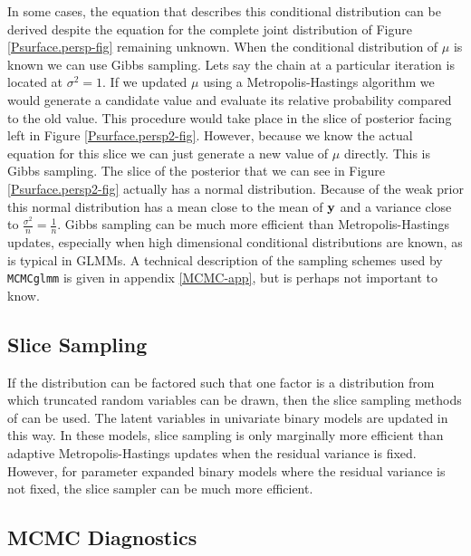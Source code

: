 \documentclass{article}
\begin{document}
 In some cases, the equation that describes this conditional distribution can be derived despite the equation for the complete joint distribution of Figure \ref{Psurface.persp-fig} remaining unknown.  When the conditional distribution of $\mu$ is known we can use Gibbs sampling. Lets say the chain at a particular iteration is located at $\sigma^{2}=1$.  If we updated $\mu$ using a Metropolis-Hastings algorithm we would generate a candidate value and evaluate its relative probability compared to the old value.  This procedure would take place in the slice of posterior facing left in Figure \ref{Psurface.persp2-fig}. However, because we know the actual equation for this slice we can just generate a new value of $\mu$ directly. This is Gibbs sampling.  The slice of the posterior that we can see in Figure \ref{Psurface.persp2-fig} actually has a normal distribution. Because of the weak prior this normal distribution has a mean close to the mean of $\bf{y}$ and a variance close to $\frac{\sigma^{2}}{n} = \frac{1}{n}$.  Gibbs sampling can be much more efficient than Metropolis-Hastings updates, especially when high dimensional conditional distributions are known, as is typical in GLMMs. A technical description of the sampling schemes used by \texttt{MCMCglmm} is given in appendix \ref{MCMC-app}, but is perhaps not important to know.

\subsection{Slice Sampling}

If the distribution can be factored such that one factor is a distribution from which truncated random variables can be drawn, then the slice sampling methods of \citet{Damien.1997} can be used. The latent variables in univariate binary models are updated in this way. In these models, slice sampling is only marginally more efficient than adaptive Metropolis-Hastings updates when the residual variance is fixed. However, for parameter expanded binary models where the residual variance is not fixed, the slice sampler can be much more efficient.

\subsection{MCMC Diagnostics}
\end{document}
